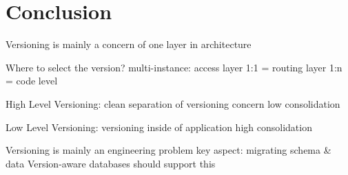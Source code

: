 \section{Conclusion}

Versioning is mainly a concern of one layer in architecture

Where to select the version?
multi-instance: access layer
1:1 = routing layer
1:n = code level

High Level Versioning:
clean separation of versioning concern
low consolidation

Low Level Versioning:
versioning inside of application
high consolidation

Versioning is mainly an engineering problem
key aspect: migrating schema & data
Version-aware databases should support this

